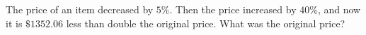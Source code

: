 The price of an item decreased by $5\%$. Then the price increased by $40\%$, and now it is $\$1352.06$ less than double the original price. What was the original price?
